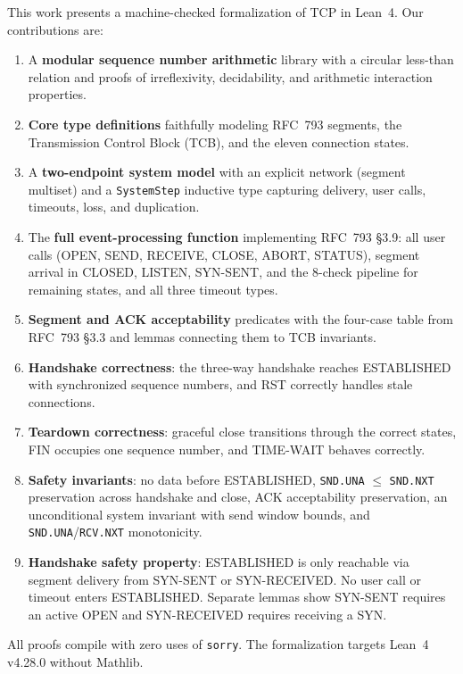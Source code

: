 \documentclass[11pt]{article}
\theoremstyle{definition}
\begin{document}
This work presents a machine-checked formalization of TCP in Lean~4. Our
contributions are:
\begin{enumerate}
  \item A \textbf{modular sequence number arithmetic} library with a circular
    less-than relation and proofs of irreflexivity, decidability, and
    arithmetic interaction properties.
  \item \textbf{Core type definitions} faithfully modeling RFC~793 segments,
    the Transmission Control Block (TCB), and the eleven connection states.
  \item A \textbf{two-endpoint system model} with an explicit network (segment
    multiset) and a \texttt{SystemStep} inductive type capturing delivery,
    user calls, timeouts, loss, and duplication.
  \item The \textbf{full event-processing function} implementing RFC~793
    \S3.9: all user calls (OPEN, SEND, RECEIVE, CLOSE, ABORT, STATUS), segment
    arrival in CLOSED, LISTEN, SYN-SENT, and the 8-check pipeline for
    remaining states, and all three timeout types.
  \item \textbf{Segment and ACK acceptability} predicates with the four-case
    table from RFC~793 \S3.3 and lemmas connecting them to TCB invariants.
  \item \textbf{Handshake correctness}: the three-way handshake reaches
    ESTABLISHED with synchronized sequence numbers, and RST correctly handles
    stale connections.
  \item \textbf{Teardown correctness}: graceful close transitions through the
    correct states, FIN occupies one sequence number, and TIME-WAIT behaves
    correctly.
  \item \textbf{Safety invariants}: no data before ESTABLISHED,
    \texttt{SND.UNA} $\leq$ \texttt{SND.NXT} preservation across handshake
    and close, ACK acceptability preservation, an unconditional system
    invariant with send window bounds, and \texttt{SND.UNA}/\texttt{RCV.NXT}
    monotonicity.
  \item \textbf{Handshake safety property}: ESTABLISHED is only reachable
    via segment delivery from SYN-SENT or SYN-RECEIVED. No user call or
    timeout enters ESTABLISHED. Separate lemmas show SYN-SENT requires an
    active OPEN and SYN-RECEIVED requires receiving a SYN.
\end{enumerate}

All proofs compile with zero uses of \texttt{sorry}. The formalization targets
Lean~4 v4.28.0 without Mathlib.
\end{document}
